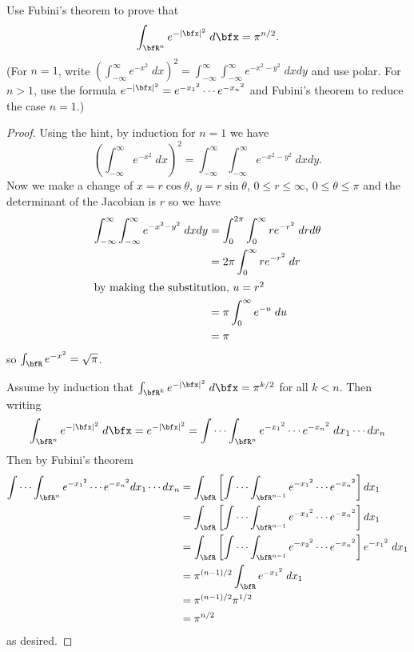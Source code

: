\begin{problem}
Use Fubini's theorem to prove that
\[
\int_{\bfR^n}e^{-|\bfx|^2}\;d\bfx=\pi^{n/2}.
\]
(For $n=1$, write $\left(\int_{-\infty}^\infty
e^{-x^2}\;dx\right)^2=\int_{-\infty}^\infty\int_{-\infty}^\infty e^{-x^2-y^2}\;dxdy$
and use polar. For $n>1$, use the formula $e^{-|\bfx|^2}=e^{-{x_1}^2}\cdots
e^{-{x_n}^2}$ and Fubini's theorem to reduce the case $n=1$.)
\end{problem}
\begin{proof}
Using the hint, by induction for $n=1$ we have
\begin{equation}
\label{eq:e-x^2-n-1}
\left(\int_{-\infty}^\infty e^{-x^2}\;dx\right)^2
=\int_{-\infty}^\infty\int_{-\infty}^\infty e^{-x^2-y^2}\;dxdy.
\end{equation}
Now we make a change of $x=r\cos\theta$, $y=r\sin\theta$, $0\leq
r\leq\infty$, $0\leq\theta\leq\pi$ and the determinant of the Jacobian is
$r$ so we have
\begin{align*}
\int_{-\infty}^\infty\int_{-\infty}^\infty e^{-x^2-y^2}\;dxdy
&=\int_{0}^{2\pi}\int_{0}^\infty re^{-r^2}\;drd\theta\\
&=2\pi\int_0^\infty re^{-r^2}\;dr\\
\intertext{by making the substitution, $u=r^2$}
&=\pi\int_0^\infty e^{-u}\;du\\
&=\pi
\end{align*}
so $\int_\bfR e^{-x^2}=\sqrt{\pi}$.

Assume by induction that $\int_{\bfR^k}e^{-|\bfx|^2}\;d\bfx=\pi^{k/2}$ for
all $k<n$. Then writing
\begin{equation}
\label{eq:e-x^n-boldface}
\int_{\bfR^n}e^{-|\bfx|^2}\;d\bfx=
e^{-|\bfx|^2}=\idotsint_{\bfR^n}e^{-{x_1}^2}\cdots e^{-{x_n}^2}\;dx_1\cdots dx_n
\end{equation}
Then by Fubini's theorem
\begin{align*}
\idotsint_{\bfR^n}e^{-{x_1}^2}\cdots e^{-{x_n}^2}dx_1\cdots dx_n
&=\int_\bfR\left[\idotsint_{\bfR^{n-1}}e^{-{x_1}^2}\cdots e^{-{x_n}^2}\right]dx_1\\
&=\int_\bfR\left[\idotsint_{\bfR^{n-1}}e^{-{x_1}^2}\cdots
  e^{-{x_n}^2}\right]dx_1\\
&=\int_\bfR\left[\idotsint_{\bfR^{n-1}}e^{-{x_2}^2}\cdots
  e^{-{x_n}^2}\right]e^{-{x_1}^2}\;dx_1\\
&=\pi^{(n-1)/2}\int_\bfR e^{-{x_1}^2}\;dx_1\\
&=\pi^{(n-1)/2}\pi^{1/2}\\
&=\pi^{n/2}
\end{align*}
as desired.
\end{proof}

